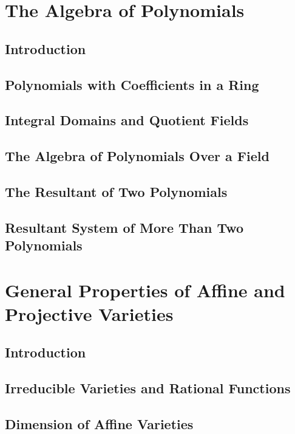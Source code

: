 \documentclass[12pt]{book}
\theoremstyle{plain}
\theoremstyle{definition}
\begin{document}
\chapter{The Algebra of Polynomials}

\section{Introduction}

\section{Polynomials with Coefficients in a Ring}

\section{Integral Domains and Quotient Fields}

\section{The Algebra of Polynomials Over a Field}

\section{The Resultant of Two Polynomials}

\section{Resultant System of More Than Two Polynomials}

\chapter{General Properties of Affine and Projective Varieties}

\section{Introduction}

\section{Irreducible Varieties and Rational Functions}

\section{Dimension of Affine Varieties}
\end{document}
